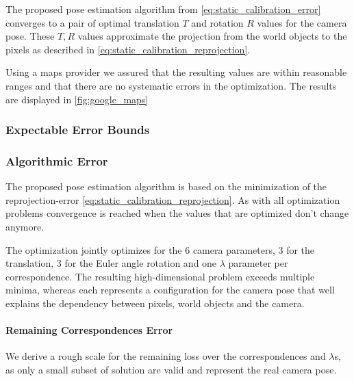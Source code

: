 The proposed pose estimation algorithm from \autoref{eq:static_calibration_error} converges to a pair of optimal translation $T$ and rotation $R$ values for the camera pose.
These $T, R$ values approximate the projection from the world objects to the pixels as described in \autoref{eq:static_calibration_reprojection}.

Using a maps provider we assured that the resulting values are within reasonable ranges and that there are no systematic errors in the optimization.
The results are displayed in \autoref{fig:google_maps}

\subsubsection{Expectable Error Bounds}
\label{sec:static_calibration_expectable_error}



































\subsubsection{Algorithmic Error}
The proposed pose estimation algorithm is based on the minimization of the reprojection-error \autoref{eq:static_calibration_reprojection}.
As with all optimization problems convergence is reached when the values that are optimized don't change anymore.

The optimization jointly optimizes for the 6 camera parameters, 3 for the translation, 3 for the Euler angle rotation and one $\lambda$ parameter per correspondence.
The resulting high-dimensional problem exceeds multiple minima, whereas each represents a configuration for the camera pose that well explains the dependency between pixels, world objects and the camera. 

\paragraph{Remaining Correspondences Error}
We derive a rough scale for the remaining loss over the correspondences and $\lambda$s, as only a small subset of solution are valid and represent the real camera pose.

